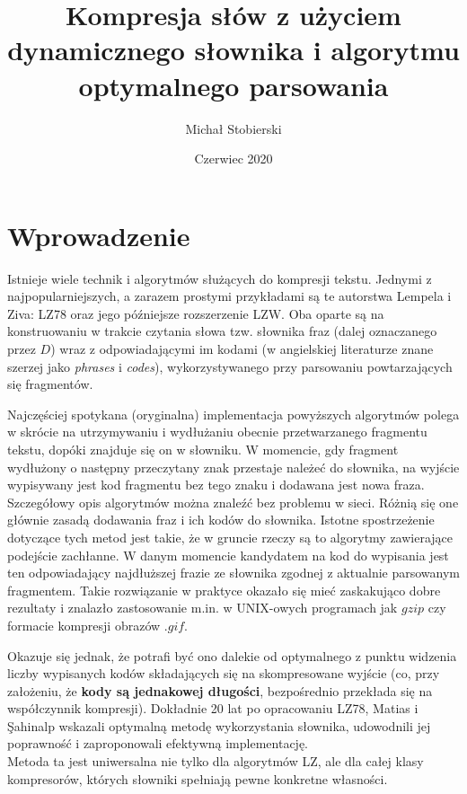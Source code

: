 \documentclass[12pt]{article}
\title{Kompresja słów z użyciem dynamicznego słownika i algorytmu optymalnego parsowania}
\author{Michał Stobierski}
\date{Czerwiec 2020}
\theoremstyle{plain}
\begin{document}
\maketitle

\section{Wprowadzenie}

Istnieje wiele technik i algorytmów służących do kompresji tekstu. Jednymi z najpopularniejszych, a zarazem prostymi przykładami są te autorstwa Lempela i Ziva: LZ78 oraz jego późniejsze rozszerzenie LZW. Oba oparte są na konstruowaniu w trakcie czytania słowa tzw. słownika fraz (dalej oznaczanego przez $D$) wraz z odpowiadającymi im kodami (w angielskiej literaturze znane szerzej jako \textit{phrases} i \textit{codes}), wykorzystywanego przy parsowaniu powtarzających się fragmentów. 

Najczęściej spotykana (oryginalna) implementacja powyższych algorytmów polega w skrócie na utrzymywaniu i wydłużaniu obecnie przetwarzanego fragmentu tekstu, dopóki znajduje się on w słowniku. W momencie, gdy fragment wydłużony o następny przeczytany znak przestaje należeć do słownika, na wyjście wypisywany jest kod fragmentu bez tego znaku i dodawana jest nowa fraza. Szczegółowy opis algorytmów można znaleźć bez problemu w sieci. Różnią się one głównie zasadą dodawania fraz i ich kodów do słownika.
\newline \newline
Istotne spostrzeżenie dotyczące tych metod jest takie, że w gruncie rzeczy są to algorytmy zawierające podejście zachłanne. W danym momencie kandydatem na kod do wypisania jest ten odpowiadający najdłuższej frazie ze słownika zgodnej z aktualnie parsowanym fragmentem. Takie rozwiązanie w praktyce okazało się mieć zaskakująco dobre rezultaty i znalazło zastosowanie m.in. w UNIX-owych programach jak $gzip$ czy formacie kompresji obrazów $.gif$.

Okazuje się jednak, że potrafi być ono dalekie od optymalnego z punktu widzenia liczby wypisanych kodów składających się na skompresowane wyjście (co, przy założeniu, że \textbf{kody są jednakowej długości}, bezpośrednio przekłada się na współczynnik kompresji). Dokładnie 20 lat po opracowaniu LZ78,  Matias i Şahinalp \cite{Matias98} wskazali optymalną metodę wykorzystania słownika, udowodnili jej poprawność i zaproponowali efektywną implementację.\\
Metoda ta jest uniwersalna nie tylko dla algorytmów LZ, ale dla całej klasy kompresorów, których słowniki spełniają pewne konkretne własności.
\end{document}
